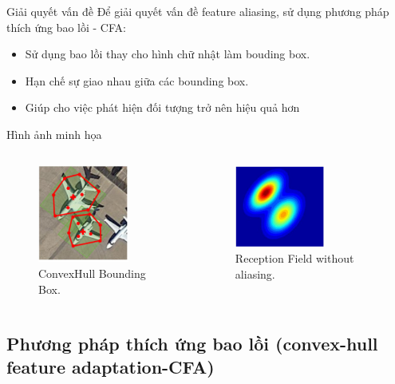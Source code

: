 \documentclass[11pt]{beamer}
\theoremstyle{definition}
\theoremstyle{plain}
\theoremstyle{plain}
\theoremstyle{remark}
\begin{document}
\begin{frame} {Giải quyết vấn đề}
	Để giải quyết vấn đề feature aliasing, sử dụng phương pháp thích ứng bao lồi - CFA:
	\begin{itemize}
		\item Sử dụng bao lồi thay cho hình chữ nhật làm bouding box.
		\item Hạn chế sự giao nhau giữa các bounding box.
		\item Giúp cho việc phát hiện đối tượng trở nên hiệu quả hơn
	\end{itemize}
	
	
\end{frame}
\begin{frame}{Hình ảnh minh họa}
	\begin{columns}[c] %
		\begin{figure}
			\centering
			\includegraphics[width=3cm]{ConvexHull_Bouding_Box.jpg}
			\caption{ConvexHull Bounding Box.}
		\end{figure}
		
		\begin{figure}
			\centering
			\includegraphics[width=3cm]{reception_field_wo_aliasing.jpg}
			\caption{Reception Field without aliasing.}
		\end{figure}
	\end{columns}
\end{frame}
\subsection{Phương pháp thích ứng bao lồi (convex-hull feature adaptation-CFA)}
\end{document}
